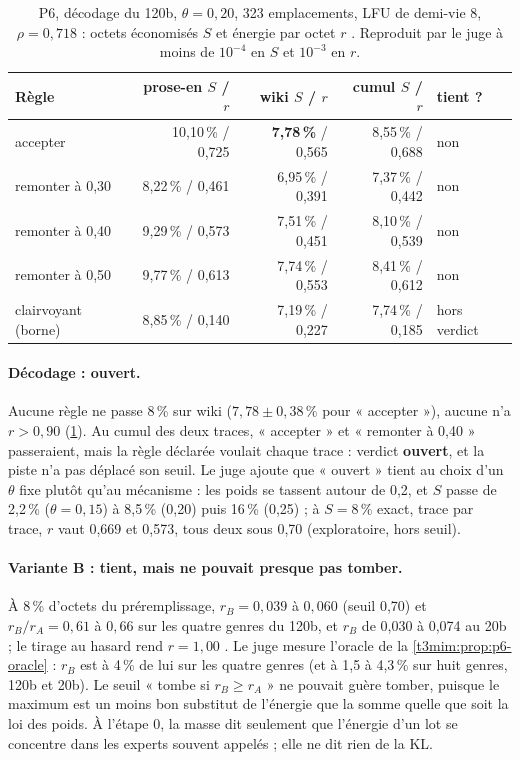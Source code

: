 \begin{table}[tbp]
\centering\small
\caption[P6 : le décodage du 120b]{P6, décodage du 120b, $\theta = 0{,}20$, 323 emplacements, LFU de demi-vie 8, $\rho = 0{,}718$ : octets économisés $S$ et énergie par octet $r$ \mes. Reproduit par le juge à moins de $10^{-4}$ en $S$ et $10^{-3}$ en $r$.}
\label{t3mim:tab:p6}
\begin{tabular}{@{}lrrrl@{}}
\toprule
Règle & prose-en $S$ / $r$ & wiki $S$ / $r$ & cumul $S$ / $r$ & tient ? \\
\midrule
accepter & 10,10\,\% / 0,725 & \textbf{7,78\,\%} / 0,565 & 8,55\,\% / 0,688 & non \\
remonter à 0,30 & 8,22\,\% / 0,461 & 6,95\,\% / 0,391 & 7,37\,\% / 0,442 & non \\
remonter à 0,40 & 9,29\,\% / 0,573 & 7,51\,\% / 0,451 & 8,10\,\% / 0,539 & non \\
remonter à 0,50 & 9,77\,\% / 0,613 & 7,74\,\% / 0,553 & 8,41\,\% / 0,612 & non \\
clairvoyant (borne) & 8,85\,\% / 0,140 & 7,19\,\% / 0,227 & 7,74\,\% / 0,185 & hors verdict \\
\bottomrule
\end{tabular}
\end{table}

\paragraph{Décodage : ouvert.} Aucune règle ne passe 8\,\% sur wiki ($7{,}78 \pm 0{,}38\,\%$ pour « accepter »), aucune n'a $r > 0{,}90$ (\cref{t3mim:tab:p6}). Au cumul des deux traces, « accepter » et « remonter à 0,40 » passeraient, mais la règle déclarée voulait chaque trace : verdict \textbf{ouvert}, et la piste n'a pas déplacé son seuil. Le juge ajoute que « ouvert » tient au choix d'un $\theta$ fixe plutôt qu'au mécanisme : les poids se tassent autour de 0,2, et $S$ passe de 2,2\,\% ($\theta = 0{,}15$) à 8,5\,\% (0,20) puis 16\,\% (0,25) ; à $S = 8\,\%$ exact, trace par trace, $r$ vaut 0,669 et 0,573, tous deux sous 0,70 (exploratoire, hors seuil).

\paragraph{Variante B : tient, mais ne pouvait presque pas tomber.} À 8\,\% d'octets du préremplissage, $r_B = 0{,}039$ à $0{,}060$ (seuil 0,70) et $r_B/r_A = 0{,}61$ à $0{,}66$ sur les quatre genres du 120b, et $r_B$ de 0,030 à 0,074 au 20b ; le tirage au hasard rend $r = 1{,}00$ \mes. Le juge mesure l'oracle de la \cref{t3mim:prop:p6-oracle} : $r_B$ est à 4\,\% de lui sur les quatre genres (et à 1,5 à 4,3\,\% sur huit genres, 120b et 20b). Le seuil « tombe si $r_B \ge r_A$ » ne pouvait guère tomber, puisque le maximum est un moins bon substitut de l'énergie que la somme quelle que soit la loi des poids. À l'étape 0, la masse dit seulement que l'énergie d'un lot se concentre dans les experts souvent appelés ; elle ne dit rien de la KL.

